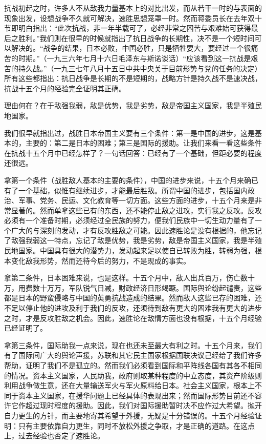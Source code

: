 抗战初起之时，许多人不从敌我力量基本上的对比出发，而从若干一时的与表面的现象出发，设想战争不久就可解决，速胜思想笼罩一时。然而蒋委员长在去年双十节即明白指出：“此次抗战，非一年半载可了，必经非常之困苦与艰难始可获得最后之胜利。”我们则在很早的时候就指出了抗日战争的长期性，决不是一个短时间可以解决的。“战争的结果，日本必败，中国必胜，只是牺牲要大，要经过一个很痛苦的时期。”（一九三六年七月十六日毛泽东与斯诺谈话）“应该看到这一抗战是艰苦的持久战。”（一九三七年八月十五日中共中央关于目前形势与党的任务的决定）所有这些都指出：抗日战争是长期的不是短期的，战略方针是持久战不是速决战，抗战十五个月的经验完全证明其正确。

理由何在？在于敌强我弱，敌是优势，我是劣势，敌是帝国主义国家，我是半殖民地国家。

我们很早就指出过，战胜日本帝国主义要有三个条件：第一是中国的进步，这是基本的，主要的：第二是日本的困难；第三是国际的援助。让我们来看一看这些条件在抗战十五个月中已经怎样了？一句话回答：已经有了一个基础，但距必要的程度还很远。

拿第一个条件（战胜敌人基本的主要的条件），中国的进步来说，十五个月来确已有了一个基础，似惟有继续进步，才能最后胜敌。所谓中国的进步，包括国内政治、军事、党务、民运、文化教育等一切方面。这些方面的进步，十五个月来是非常显著的。然而单拿这些已有的东西，还不能停止敌之进攻，实行我之反攻。反攻必须有一个准备时期，必须经过全民族的努力，便我们民族中一切生动力量有了一个广大的与深刻的发动，才有反攻胜敌之可能。因此速胜论是没有根据的，他忘记了敌强我弱这一特点，忘记了敌是优势，我是劣势，敌是帝国主义国家，我是半殖民地国家。中国具有很大的潜势力，发动起来足以使自已转败为胜，转弱为强，根本变化敌我形势，然而还待今后的努力，不是现成的事实。

拿第二条件，日本困难来说，也是这样。十五个月中，敌人出兵百万，伤亡数十万，用费数十万万，军队锐气日减，财政经济日形竭蹶。国际舆论纷起谴责，这些都是日本的野蛮侵略与中国的英勇抗战造成的结果。然而敌人这些已存的困难，还不足以停止他的进攻及利于我们的反攻，还须待到敌有更大的困难我有更大的进步之时，才是反攻胜敌之机会。因此，速胜论在敌情方面也没有根据，十五个月经验已经证明了。

拿第三条件，国际助我一点来说，现在也还未至最大有利之时。十五个月来，我们有了国际间广大的舆论声援，苏联和其它民主国家根据国联决议己经给了我们许多帮助，证明了我们不是孤立的。然而我们必须看到国际和平阵线各国有其各不相同的情况。资本主义国家，人民助我，政府则取某种程度的中立态度，其资产阶级则利用战争做生意，还在大量输送军火与军火原料给日本。社会主义国家，根本上不同于资本主义国家，在援华问题上已经具体的表现出来；然而国际形势目前还不容许它作超过现时程度的援助。因此，我们对国际援助暂时决不应作过大希望。抛开自力更生的方针，而主要地寄其希望于外援，无疑是十分错误的。十五个月经验证明：只有主要依靠自力更生，同时不放松外援之争取，才是正确的道路。在这点上，过去经验也否定了速胜论。

